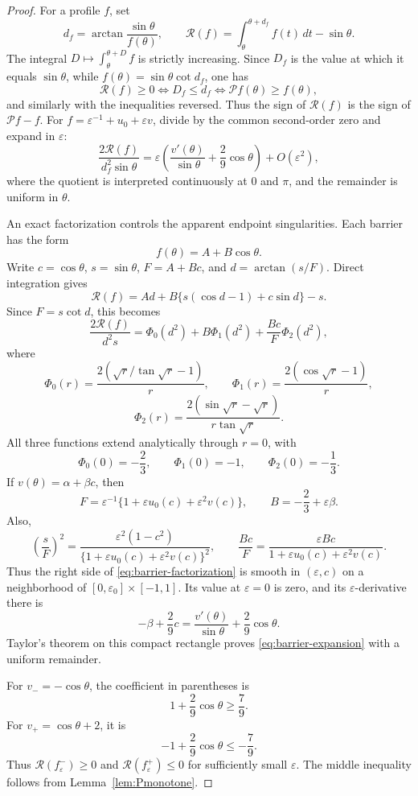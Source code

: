 \documentclass[11pt]{article}
\theoremstyle{remark}
\newcommand{\eps}{\varepsilon}
\begin{document}
\begin{proof}
For a profile \(f\), set
\[
   d_f=\arctan\frac{\sin\theta}{f(\theta)},
   \qquad
   \mathcal R(f)
   =\int_\theta^{\theta+d_f}f(t)\,dt-\sin\theta.
\]
The integral \(D\mapsto\int_\theta^{\theta+D}f\) is strictly increasing.
Since \(D_f\) is the value at which it equals \(\sin\theta\), while
\(f(\theta)=\sin\theta\cot d_f\), one has
\[
 \mathcal R(f)\geq0
 \iff D_f\leq d_f
 \iff \mathcal Pf(\theta)\geq f(\theta),
\]
and similarly with the inequalities reversed.  Thus the sign of
\(\mathcal R(f)\) is the sign of \(\mathcal Pf-f\).
For \(f=\eps^{-1}+u_0+\eps v\), divide by the common second-order zero
and expand in \(\eps\):
\begin{equation}\label{eq:barrier-expansion}
   \frac{2\mathcal R(f)}{d_f^2\sin\theta}
   =\eps\left(
       \frac{v'(\theta)}{\sin\theta}+\frac29\cos\theta
     \right)+O(\eps^2),
\end{equation}
where the quotient is interpreted continuously at \(0\) and \(\pi\),
and the remainder is uniform in \(\theta\).

An exact factorization controls the apparent endpoint singularities.  Each
barrier has the form
\[
   f(\theta)=A+B\cos\theta.
\]
Write \(c=\cos\theta\), \(s=\sin\theta\),
\(F=A+Bc\), and \(d=\arctan(s/F)\).  Direct integration gives
\begin{equation}\label{eq:barrier-exact-residual}
   \mathcal R(f)
   =Ad+B\{s(\cos d-1)+c\sin d\}-s.
\end{equation}
Since \(F=s\cot d\), this becomes
\begin{equation}\label{eq:barrier-factorization}
 \frac{2\mathcal R(f)}{d^2s}
 =\Phi_0(d^2)+B\Phi_1(d^2)+\frac{Bc}{F}\Phi_2(d^2),
\end{equation}
where
\[
 \Phi_0(r)=\frac{2(\sqrt r/\tan\sqrt r-1)}r,
 \qquad
 \Phi_1(r)=\frac{2(\cos\sqrt r-1)}r,
\]
\[
 \Phi_2(r)=\frac{2(\sin\sqrt r-\sqrt r)}
                  {r\tan\sqrt r}.
\]
All three functions extend analytically through \(r=0\), with
\[
 \Phi_0(0)=-\frac23,
 \qquad \Phi_1(0)=-1,
 \qquad \Phi_2(0)=-\frac13.
\]
If \(v(\theta)=\alpha+\beta c\), then
\[
 F=\eps^{-1}\{1+\eps u_0(c)+\eps^2v(c)\},
 \qquad B=-\frac23+\eps\beta.
\]
Also,
\[
 \left(\frac{s}{F}\right)^2
 =\frac{\eps^2(1-c^2)}{\{1+\eps u_0(c)+\eps^2v(c)\}^2},
 \qquad
 \frac{Bc}{F}
 =\frac{\eps Bc}{1+\eps u_0(c)+\eps^2v(c)}.
\]
Thus the right side of \eqref{eq:barrier-factorization} is smooth in
\((\eps,c)\) on a neighborhood of
\([0,\eps_0]\times[-1,1]\).  Its value at \(\eps=0\) is zero, and its
\(\eps\)-derivative there is
\[
   -\beta+\frac29c
   =\frac{v'(\theta)}{\sin\theta}+\frac29\cos\theta.
\]
Taylor's theorem on this compact rectangle proves
\eqref{eq:barrier-expansion} with a uniform remainder.

For \(v_-=-\cos\theta\), the coefficient in parentheses is
\[
   1+\frac29\cos\theta\geq\frac79.
\]
For \(v_+=\cos\theta+2\), it is
\[
   -1+\frac29\cos\theta\leq-\frac79.
\]
Thus \(\mathcal R(f_\eps^-)\geq0\) and
\(\mathcal R(f_\eps^+)\leq0\) for sufficiently small \(\eps\).
The middle inequality follows from Lemma~\ref{lem:Pmonotone}.
\end{proof}
\end{document}
